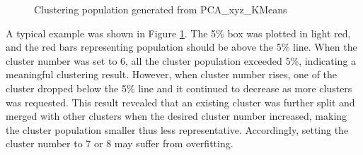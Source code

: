 \documentclass[a4paper]{article}
\begin{document}
\begin{figure}[H]
    \centering
    \caption{Clustering population generated from PCA\_xyz\_KMeans}
    \label{fig: clustering pop}
\end{figure}

A typical example was shown in Figure \ref{fig: clustering pop}. The 5\% box was plotted in light red, and the red bars representing population should be above the 5\% line. When the cluster number was set to 6, all the cluster population exceeded 5\%, indicating a meaningful clustering result. However, when cluster number rises, one of the cluster dropped below the 5\% line and it continued to decrease as more clusters was requested. This result revealed that an existing cluster was further split and merged with other clusters when the desired cluster number increased, making the cluster population smaller thus less representative. Accordingly, setting the cluster number to 7 or 8 may suffer from overfitting.
\end{document}
